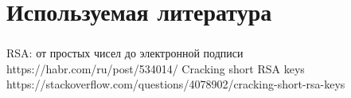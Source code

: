 \documentclass[t]{beamer}
\begin{document}
\section{Используемая литература}

\begin{frame}
    \frametitle{\insertsection}
    \begin{thebibliography}{1}
    RSA: от простых чисел до электронной подписи \newline 
    https://habr.com/ru/post/534014/
    Cracking short RSA keys \newline 
    https://stackoverflow.com/questions/4078902/cracking-short-rsa-keys
    \end{thebibliography}
\end{frame}
\end{document}
